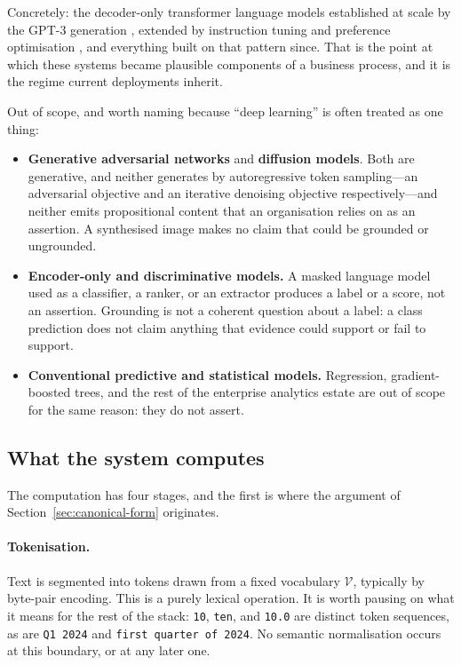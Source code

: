 \documentclass[11pt]{article}
\theoremstyle{plain}
\theoremstyle{definition}
\begin{document}
Concretely: the decoder-only transformer language models established at scale by
the GPT-3 generation \citep{brown2020}, extended by instruction tuning and
preference optimisation \citep{ouyang2022}, and everything built on that pattern
since. That is the point at which these systems became plausible components of a
business process, and it is the regime current deployments inherit.

Out of scope, and worth naming because ``deep learning'' is often treated as one
thing:

\begin{itemize}
  \item \textbf{Generative adversarial networks} and \textbf{diffusion models}.
        Both are generative, and neither generates by autoregressive token
        sampling---an adversarial objective and an iterative denoising objective
        respectively---and neither emits propositional content that an
        organisation relies on as an assertion. A synthesised image makes no claim
        that could be grounded or ungrounded.
  \item \textbf{Encoder-only and discriminative models.} A masked language model
        used as a classifier, a ranker, or an extractor produces a label or a
        score, not an assertion. Grounding is not a coherent question about a
        label: a class prediction does not claim anything that evidence could
        support or fail to support.
  \item \textbf{Conventional predictive and statistical models.} Regression,
        gradient-boosted trees, and the rest of the enterprise analytics estate
        are out of scope for the same reason: they do not assert.
\end{itemize}

\subsection{What the system computes}
\label{sec:what-computed}

The computation has four stages, and the first is where the argument of
Section~\ref{sec:canonical-form} originates.

\paragraph{Tokenisation.} Text is segmented into tokens drawn from a fixed
vocabulary $\mathcal{V}$, typically by byte-pair encoding. This is a purely
lexical operation. It is worth pausing on what it means for the rest of the stack:
\texttt{10}, \texttt{ten}, and \texttt{10.0} are distinct token sequences, as are
\texttt{Q1 2024} and \texttt{first quarter of 2024}. No semantic normalisation
occurs at this boundary, or at any later one.
\end{document}
